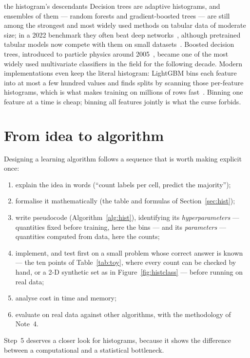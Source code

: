 \documentclass[11pt]{article}
\begin{document}
\begin{modern}{the histogram's descendants}
Decision trees are adaptive histograms, and ensembles of them --- random forests and gradient-boosted trees --- are
still among the strongest and most widely used methods on tabular data of moderate size; in a 2022 benchmark they
often beat deep networks~\cite{grinsztajn2022}, although pretrained tabular models now compete with them on small
datasets~\cite{hollmann2025}. Boosted decision trees, introduced to particle physics around 2005~\cite{roe2005},
became one of the most widely used multivariate classifiers in the field for the following decade. Modern implementations even keep the literal histogram: LightGBM bins each feature into at most a
few hundred values and finds splits by scanning those per-feature histograms, which is what makes training on
millions of rows fast~\cite{ke2017}. Binning one feature at a time is cheap; binning all features jointly is what
the curse forbids.
\end{modern}

\section{From idea to algorithm}\label{sec:design}

Designing a learning algorithm follows a sequence that is worth making explicit once:
\begin{enumerate}
\item explain the idea in words (``count labels per cell, predict the majority'');
\item formalise it mathematically (the table and formulas of Section~\ref{sec:hist});
\item write pseudocode (Algorithm~\ref{alg:hist}), identifying its \emph{hyperparameters} --- quantities fixed before
training, here the bins --- and its \emph{parameters} --- quantities computed from data, here the counts;
\item implement, and test first on a small problem whose correct answer is known --- the ten points of
Table~\ref{tab:toy}, where every count can be checked by hand, or a 2-D synthetic set as in
Figure~\ref{fig:histclass} --- before running on real data;
\item analyse cost in time and memory;
\item evaluate on real data against other algorithms, with the methodology of Note~4.
\end{enumerate}
Step~5 deserves a closer look for histograms, because it shows the difference between a computational and a
statistical bottleneck.
\end{document}

